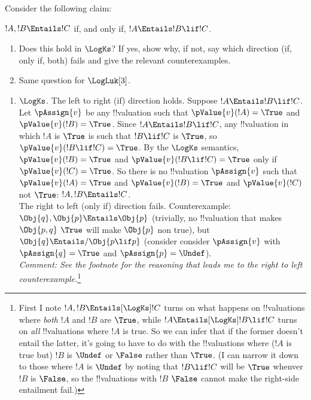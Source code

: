 \documentclass[../../../../include/open-logic-section]{subfiles}
\begin{document}
\begin{prob}
Consider the following claim: 

$!A, !B \Entails !C$ if, and only if, $!A \Entails !B \lif !C$.
\begin{enumerate}
	\item Does this hold in $\LogKs$? If yes, show why, if not, say which
	 direction (if, only if, both) fails and give the relevant counterexamples.
	 \item Same question for $\LogLuk[3]$.
\end{enumerate}
\begin{ans}
\begin{enumerate}
\item $\LogKs$. The left to right (if) direction holds. Suppose $!A \Entails !B \lif
	!C$.  Let $\pAssign{v}$ be any !!{valuation} such that
	$\pValue{v}(!A)=\True$ and $\pValue{v}(!B)=\True$. Since $!A \Entails
	!B \lif !C$, any !!{valuation} in which $!A$ is $\True$ is such that
	$!B \lif !C$ is $\True$, so $\pValue{v}(!B  \lif !C)=\True$. By the
	$\LogKs$ semantics, $\pValue{v}(!B)=\True$ and  $\pValue{v}(!B \lif
	!C)=\True$ only if $\pValue{v}(!C)=\True$. So there is no
	!!{valuation} $\pAssign{v}$ such that $\pValue{v}(!A)=\True$ and
	$\pValue{v}(!B)=\True$ and $\pValue{v}(!C)$ not $\True$: $!A, !B
	\Entails !C$.\\ 
	The right to left (only if) direction fails.
	Counterexample: $\Obj{q},  \Obj{p} \Entails \Obj{p}$ (trivially, no
	!!{valuation} that makes $\Obj{p,q}$ $\True$ will make $\Obj{p}$ non
	true), but $\Obj{q} \Entails/ \Obj{p \lif p}$ (consider  consider
	$\pAssign{v}$ with $\pAssign{q}=\True$ and $\pAssign{p}=\Undef$).\\
	\emph{Comment: See the footnote for the reasoning that leads me to
	the right to left counterexample.}\footnote{First I note $!A, 
	!B \Entails[\LogKs]
	!C$ turns on what happens on !!{valuation}s where \emph{both} $!A$
	and $!B$ are $\True$, while $!A \Entails[\LogKs] !B \lif
	!C$ turns on \emph{all} !!{valuation}s where $!A$ is true. So we can
	infer that if the former doesn't entail the latter, it's going to 
	have to do with the !!{valuation}s where ($!A$ is true but) $!B$ is $\Undef$ 
	or $\False$ rather than $\True$. (I can narrow it down to those
	where $!A$ is $\Undef$ by noting that $!B \lif !C$ will be $\True$ 
	whenver $!B$ is $\False$, so the !!{valuation}s with $!B$ $\False$ 
	cannot make the right-side entailment fail.) 

}
\end{enumerate}
\end{ans}
\end{prob}
\end{document}
